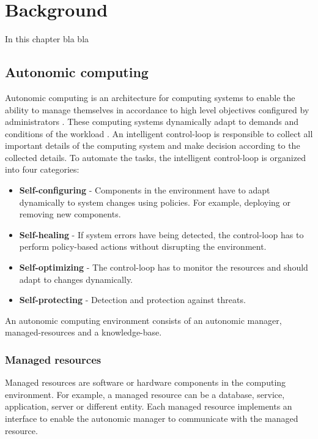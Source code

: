 \chapter{Background}
\label{sec:background}
%
In this chapter bla bla

\section{Autonomic computing}
Autonomic computing is an architecture for computing systems to enable the ability to manage themselves in accordance to high level objectives configured by administrators \cite{Kephart2003VisionComputing}. 
These computing systems dynamically adapt to demands and conditions of the workload \cite{Kephart2003VisionComputing}.
An intelligent control-loop is responsible to collect all important details of the computing system and make decision according to the collected details. To automate the tasks, the intelligent control-loop is organized into four categories:

\begin{itemize}
\item \textbf{Self-configuring}
- Components in the environment have to adapt dynamically to system changes using policies. For example, deploying or removing new components.

\item \textbf{Self-healing}
- If system errors have being detected, the control-loop has to perform policy-based actions without disrupting the 
environment.

\item \textbf{Self-optimizing}
- The control-loop has to monitor the resources and should adapt to changes dynamically.

\item \textbf{Self-protecting}
- Detection and protection against threats.

\end{itemize}

 An autonomic computing environment consists of an autonomic manager, managed-resources and a knowledge-base.
 
\subsection{Managed resources}
Managed resources are software or hardware components in the computing environment. For example, a managed resource 
can be a database, service, application, server or different entity. Each managed resource implements an interface to enable 
the autonomic manager to communicate with the managed resource. 

